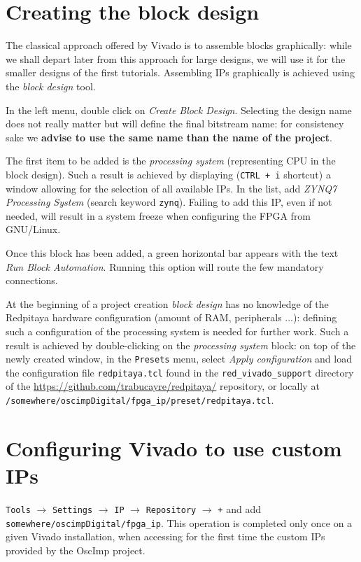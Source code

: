 \documentclass[10pt,oneside]{article}
\begin{document}
\section{Creating the block design}

The classical approach offered by Vivado is to assemble blocks graphically: while we
shall depart later from this approach for large designs, we will use it for the smaller
designs of the first tutorials. Assembling IPs graphically is achieved using the
{\em block design} tool.

In the left menu, double click on {\em Create Block Design}. Selecting the design
name does not really matter but will define the final bitstream name: for consistency
sake we {\bf advise to use the same name than the name of the project}.

The first item to be added is the {\em processing system} (representing CPU in the
block design). Such a result is achieved by displaying ({\tt CTRL + i} shortcut) a
window allowing for the selection of all available IPs. In the list, add {\em ZYNQ7 
Processing System} (search keyword {\tt zynq}). Failing to add this IP, even if not needed,
will result in a system freeze when configuring the FPGA from GNU/Linux.

Once this block has been added, a green horizontal bar appears with the text
{\em Run Block Automation}. Running this option will route the few mandatory connections.

At the beginning of a project creation {\em block design} has no knowledge of the
Redpitaya hardware configuration (amount of RAM, peripherals ...): defining such
a configuration of the processing system is needed for further work. Such a result
is achieved by double-clicking on the {\em processing system} block: on top
of the newly created window, in the {\tt Presets} menu, select {\em Apply configuration} 
and load the configuration file {\tt redpitaya.tcl} found in the {\tt red\_vivado\_support} 
directory of the \url{https://github.com/trabucayre/redpitaya/} repository, or
locally at\\
{\tt /somewhere/oscimpDigital/fpga\_ip/preset/redpitaya.tcl}.

\section{Configuring Vivado to use custom IPs}

{\tt Tools} $\rightarrow$ {\tt Settings} $\rightarrow$ {\tt IP} 
$\rightarrow$ {\tt Repository} $\rightarrow$ {\tt +} and add
{\tt somewhere/oscimpDigital/fpga\_ip}. This operation is completed only once on a given
Vivado installation, when accessing for the first time the custom IPs provided by
the OscImp project.
\end{document}
